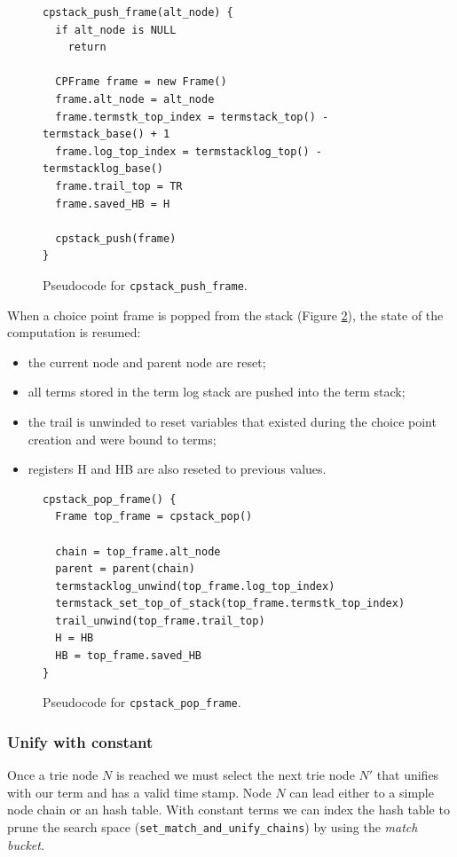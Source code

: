 \begin{figure}[H]
\begin{Verbatim}[fontsize=\small]
cpstack_push_frame(alt_node) {
  if alt_node is NULL
    return
  
  CPFrame frame = new Frame()
  frame.alt_node = alt_node
  frame.termstk_top_index = termstack_top() - termstack_base() + 1
  frame.log_top_index = termstacklog_top() - termstacklog_base()
  frame.trail_top = TR
  frame.saved_HB = H
  
  cpstack_push(frame)
}
\end{Verbatim}
\caption{Pseudo\-code for \texttt{cpstack\_push\_frame}.}
\label{fig:cpstack_push_frame}
\end{figure}

When a choice point frame is popped from the stack (Figure \ref{fig:cpstack_pop_frame}),
the state of the computation is resumed:

\begin{itemize}
  \item the current node and parent node are reset;
  \item all terms stored in the term log stack are pushed into the term stack;
  \item the trail is unwinded to reset variables that existed during the choice point creation and were bound to terms;
  \item registers H and HB are also reseted to previous values.
\end{itemize}

\begin{figure}[H]
\begin{Verbatim}[fontsize=\small]
cpstack_pop_frame() {
  Frame top_frame = cpstack_pop()
  
  chain = top_frame.alt_node
  parent = parent(chain)
  termstacklog_unwind(top_frame.log_top_index)
  termstack_set_top_of_stack(top_frame.termstk_top_index)
  trail_unwind(top_frame.trail_top)
  H = HB
  HB = top_frame.saved_HB
}
\end{Verbatim}
\caption{Pseudo\-code for \texttt{cpstack\_pop\_frame}.}
\label{fig:cpstack_pop_frame}
\end{figure}

\subsubsection{Unify with constant}

Once a trie node $N$ is reached we must select the next trie node $N'$ that unifies with our term and has a valid time stamp. Node $N$ can lead either to a simple node chain or an hash table.
With constant terms we can index the hash table to prune the search space (\texttt{set\_match\_and\_unify\_chains}) by using the \textit{match bucket}.

